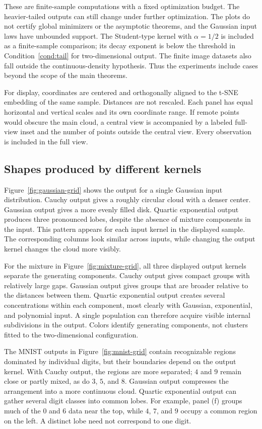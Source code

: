 These are finite-sample computations with a fixed optimization budget.
The heavier-tailed outputs can still change under further optimization.
The plots do not certify global minimizers or the asymptotic theorems, and
the Gaussian input laws have unbounded support. The Student-type kernel with
$\alpha=1/2$ is included as a finite-sample comparison; its decay exponent
is below the threshold in Condition~\ref{cond:tail} for two-dimensional
output. The finite image datasets also fall outside the continuous-density
hypothesis. Thus the experiments include cases beyond the scope of the
main theorems.

For display, coordinates are centered and orthogonally aligned to the
t-SNE embedding of the same sample. Distances are not rescaled. Each panel
has equal horizontal and vertical scales and its own coordinate range.
If remote points would obscure the main cloud, a central view is accompanied
by a labeled full-view inset and the number of points outside the central
view. Every observation is included in the full view.

\subsection{Shapes produced by different kernels}

Figure~\ref{fig:gaussian-grid} shows the output for a single Gaussian input
distribution. Cauchy output gives a roughly circular cloud with a denser
center. Gaussian output gives a more evenly filled disk. Quartic exponential
output produces three pronounced lobes, despite the absence of mixture
components in the input. This pattern appears for each input kernel in the
displayed sample. The corresponding columns look similar across inputs,
while changing the output kernel changes the cloud more visibly.

For the mixture in Figure~\ref{fig:mixture-grid}, all three displayed output
kernels separate the generating components. Cauchy output gives compact
groups with relatively large gaps. Gaussian output gives groups that are
broader relative to the distances between them. Quartic exponential output creates several concentrations within
each component, most clearly with Gaussian, exponential, and polynomial
input. A single population can therefore acquire visible internal
subdivisions in the output. Colors identify generating components, not
clusters fitted to the two-dimensional configuration.

\begin{samepage}
The MNIST outputs in Figure~\ref{fig:mnist-grid} contain recognizable regions
dominated by individual digits, but their boundaries depend on the output
kernel. With Cauchy output, the regions are more separated; $4$ and $9$
remain close or partly mixed, as do $3$, $5$, and $8$. Gaussian output
compresses the arrangement into a more continuous cloud. Quartic exponential
output can gather several digit classes into common lobes. For example,
panel (f) groups much of the $0$ and $6$ data near the top, while $4$, $7$,
and $9$ occupy a common region on the left. A distinct lobe need not
correspond to one digit.
\end{samepage}

